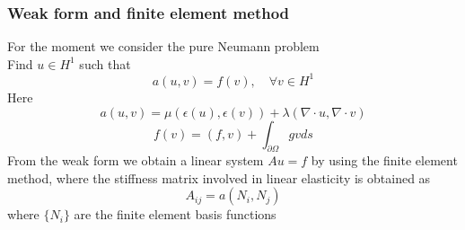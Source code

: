 \begin{frame}
\frametitle{Weak form and finite element method}
For the moment we consider the \alert{pure Neumann problem}\\ 
Find $u\in H^1$ such that
\[
a(u,v)  = f(v), \quad \forall v\in H^1 
\]
Here 
\[
a(u,v) = \mu (\epsilon(u), \epsilon(v)) + \lambda (\nabla\cdot  u, \nabla\cdot v)
\]  
\[
f(v) = (f,v) + \int_{\partial \Omega} g v ds
\] 
From the weak form we obtain a linear system $A u = f$
by using the finite element method, where 
the stiffness matrix involved in linear elasticity is obtained as 
\[
A_{ij} = a(N_i, N_j)
\]
where $\{N_i\}$ are the finite element basis functions 
\end{frame}
